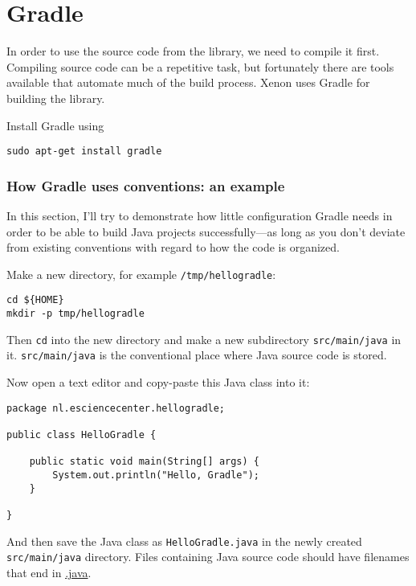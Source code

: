 \section{Gradle}

In order to use the source code from the library, we need to compile it first. Compiling source code can be a repetitive task, but fortunately there are tools available that automate much of the build process. Xenon uses Gradle for building the library.

Install Gradle using
\begin{lstlisting}[style=basic,style=bash]
sudo apt-get install gradle
\end{lstlisting}




\subsubsection{How Gradle uses conventions: an example}

In this section, I'll try to demonstrate how little configuration Gradle needs in order to be able to build Java projects successfully---as long as you don't deviate from existing conventions with regard to how the code is organized.

Make a new directory, for example \texttt{\mytilde{}/tmp/hellogradle}:
\begin{lstlisting}[style=basic,style=bash]
cd ${HOME}
mkdir -p tmp/hellogradle
\end{lstlisting} %


Then \texttt{cd} into the new directory and make a new subdirectory \texttt{src/main/java} in it. \texttt{src/main/java} is the conventional place where Java source code is stored.

Now open a text editor and copy-paste this Java class into it:
\begin{lstlisting}[style=basic,style=Java]
package nl.esciencecenter.hellogradle;

public class HelloGradle {

    public static void main(String[] args) {
        System.out.println("Hello, Gradle");
    }

}
\end{lstlisting}
And then save the Java class as \texttt{HelloGradle.java} in the newly created \texttt{src/main/java} directory. Files containing Java source code should have filenames that end in \url{.java}.

